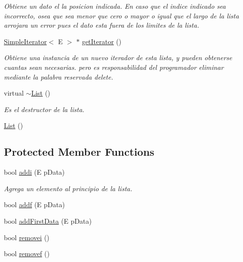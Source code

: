 \begin{DoxyCompactItemize}
\begin{DoxyCompactList}\small\item\em Obtiene un dato el la posicion indicada. En caso que el indice indicado sea incorrecto, osea que sea menor que cero o mayor o igual que el largo de la lista arrojara un error pues el dato esta fuera de los limites de la lista. \end{DoxyCompactList}\item 
\hyperlink{class_simple_iterator}{Simple\-Iterator}$<$ E $>$ $\ast$ \hyperlink{class_list_accb5fe71cb60ba7bf0ccab362b1f87cb}{get\-Iterator} ()
\begin{DoxyCompactList}\small\item\em Obtiene una instancia de un nuevo iterador de esta lista, y pueden obtenerse cuantas sean necesarias. pero es responsabilidad del programador eliminar mediante la palabra reservada delete. \end{DoxyCompactList}\item 
virtual \hyperlink{class_list_a0af4c4d8a3d0710e58b12db35f9b0a3d}{$\sim$\-List} ()
\begin{DoxyCompactList}\small\item\em Es el destructor de la lista. \end{DoxyCompactList}\item 
\hyperlink{class_list_ae47afd06bd8c39fe7a12d4489998e7c5}{List} ()
\end{DoxyCompactItemize}
\subsection*{Protected Member Functions}
\begin{DoxyCompactItemize}
\item 
bool \hyperlink{class_list_a92ad933f8d3a033b84a517fb6cc4111a}{addi} (E p\-Data)
\begin{DoxyCompactList}\small\item\em Agrega un elemento al principio de la lista. \end{DoxyCompactList}\item 
bool \hyperlink{class_list_a3c920f9c86d2853121c5cd2fb46f8436}{addf} (E p\-Data)
\item 
bool \hyperlink{class_list_ac38635d10f3faaf49af53c0b66347d0f}{add\-First\-Data} (E p\-Data)
\item 
bool \hyperlink{class_list_a1d0a5649ddd83cb781174698f80b2e0f}{removei} ()
\item 
bool \hyperlink{class_list_a45231b54bf8c98948becddd0923be138}{removef} ()
\end{DoxyCompactItemize}

